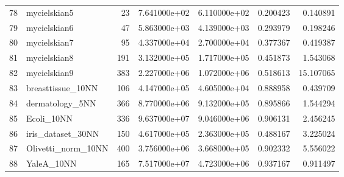 \begin{tabular}{llrrrrr}
78 &        mycielskian5 &    23 &  7.641000e+02 &  6.110000e+02 &  0.200423 &   0.140891 \\
79 &        mycielskian6 &    47 &  5.863000e+03 &  4.139000e+03 &  0.293979 &   0.198246 \\
80 &        mycielskian7 &    95 &  4.337000e+04 &  2.700000e+04 &  0.377367 &   0.419387 \\
81 &        mycielskian8 &   191 &  3.132000e+05 &  1.717000e+05 &  0.451873 &   1.543068 \\
82 &        mycielskian9 &   383 &  2.227000e+06 &  1.072000e+06 &  0.518613 &  15.107065 \\
83 &   breasttissue\_10NN &   106 &  4.147000e+05 &  4.605000e+04 &  0.888958 &   0.439709 \\
84 &     dermatology\_5NN &   366 &  8.770000e+06 &  9.132000e+05 &  0.895866 &   1.544294 \\
85 &          Ecoli\_10NN &   336 &  9.637000e+07 &  9.046000e+06 &  0.906131 &   2.456245 \\
86 &   iris\_dataset\_30NN &   150 &  4.617000e+05 &  2.363000e+05 &  0.488167 &   3.225024 \\
87 &  Olivetti\_norm\_10NN &   400 &  3.756000e+06 &  3.668000e+05 &  0.902332 &   5.556022 \\
88 &          YaleA\_10NN &   165 &  7.517000e+07 &  4.723000e+06 &  0.937167 &   0.911497 \\
\bottomrule
\end{tabular}

